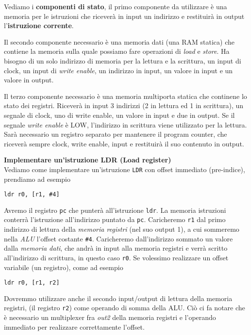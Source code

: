 Vediamo i \textbf{componenti di stato}, il primo componente da utilizzare è una memoria per le istruzioni che riceverà in input
un indirizzo e restituirà in output l'\textbf{istruzione corrente}.

Il secondo componente necessario è una memoria dati (una RAM statica) che contiene la memoria sulla quale possiamo fare operazioni di \textit{load} e \textit{store}.
Ha bisogno di un solo indirizzo di memoria per la lettura e la scrittura, un input di clock, un input di \textit{write enable}, un indirizzo in input, un valore in input e un valore in output.

Il terzo componente necessario è una memoria multiporta statica che continene lo stato dei registri.
Riceverà in input 3 indirizzi (2 in lettura ed 1 in scrittura), un segnale di clock, uno di write enable, un valore in input e due in output.
Se il segnale \textit{write enable} è LOW, l'indirizzo in scrittura viene utilizzato per la lettura.
Sarà necessario un registro separato per mantenere il program counter, che riceverà sempre clock, write enable, input e restituirà il suo contenuto in output.


\begin{defn}
\textbf{Implementare un'istruzione LDR (Load register)} \\
Vediamo come implementare un'istruzione \texttt{LDR} con offset immediato (pre-indice), prendiamo ad esempio
\begin{lstlisting}[style=arm]
ldr r0, [r1, #4]
\end{lstlisting}
Avremo il registro \texttt{pc} che punterà all'istruzione \texttt{ldr}. La memoria istruzioni conterrà l'istruzione all'indirizzo puntato da \texttt{pc}.
Caricheremo \texttt{r1} dal primo indirizzo di lettura della \textit{memoria registri} (nel suo output 1), a cui sommeremo  nella \textit{ALU} l'offset costante \texttt{\#4}.
Caricheremo dall'indirizzo sommato un valore dalla \textit{memoria dati}, che andrà in input alla memoria registri e verrà scritto all'indirizzo di scrittura,
in questo caso \texttt{r0}.
Se volessimo realizzare un offset variabile (un registro), come ad esempio
\begin{lstlisting}[style=arm]
ldr r0, [r1, r2]
\end{lstlisting}
Dovremmo utilizzare anche il secondo input/output di lettura della memoria registri, (il registro \texttt{r2}) come operando di somma della ALU.
Ciò ci fa notare che è necessario un multiplexer fra \textit{out2} della memoria registri e l'operando immediato per realizzare correttamente l'offset.
\end{defn}


